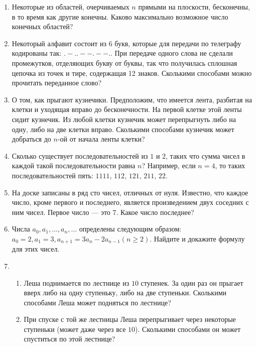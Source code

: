 \begin{enumerate}
\item Некоторые из областей, очерчиваемых $n$ прямыми на плоскости, бесконечны,
в то время как другие конечны. Каково максимально возможное число конечных областей?

\item Некоторый алфавит состоит из 6 букв, которые для передачи по телеграфу кодированы так:
$. - .. -- .- -.$. При передаче одного слова не сделали промежутков, отделяющих букву от буквы, так что получилась сплошная цепочка из точек и тире, содержащая 12 знаков. Сколькими способами можно прочитать переданное слово? 

\item О том, как прыгают кузнечики. Предположим, что имеется лента, разбитая на клетки и уходящая вправо до бесконечности. На первой клетке этой ленты сидит кузнечик. Из любой клетки кузнечик может перепрыгнуть либо на одну, либо на две клетки вправо. Сколькими способами кузнечик может добраться до $n$-ой от начала ленты клетки? 

\item Сколько существует последовательностей из $1$ и $2$, таких что сумма чисел в каждой такой последовательности равна $n$? Например, если $n = 4$, то таких последовательностей пять:
$1111$, $112$, $121$, $211$, $22$.

\item На доске записаны в ряд сто чисел, отличных от нуля. Известно, что каждое число, кроме первого и последнего, является произведением двух соседних с ним чисел. Первое число –-- это $7$. Какое число последнее?

\item Числа $a_0, a_1, \ldots , a_n, \ldots$ определены следующим образом:
$a_0 = 2, a_1 = 3,  a_{n + 1} = 3a_n - 2a_{n - 1} (n \ge 2)$.
Найдите и докажите формулу для этих чисел. 

\item \begin{enumerate}
    \item Леша поднимается по лестнице из $10$ ступенек. За один раз он прыгает вверх либо на одну  
          ступеньку, либо на две ступеньки. Сколькими способами Леша может подняться по лестнице? 
    \item При спуске с той же лестницы Леша перепрыгивает через некоторые ступеньки (может даже 
          через все $10$). Сколькими способами он может спуститься по этой лестнице?
\end{enumerate}


\end{enumerate}
